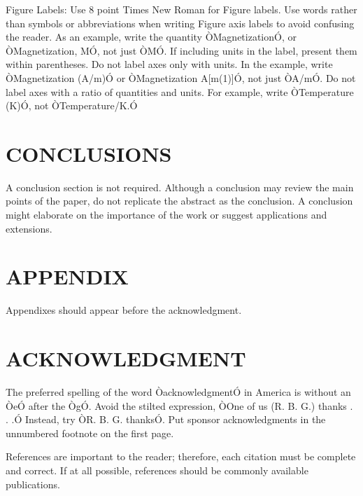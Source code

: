\documentclass[letterpaper, 10 pt, conference]{ieeeconf}  %
\begin{document}
Figure Labels: Use 8 point Times New Roman for Figure labels. Use words rather than symbols or abbreviations when writing Figure axis labels to avoid confusing the reader. As an example, write the quantity ÒMagnetizationÓ, or ÒMagnetization, MÓ, not just ÒMÓ. If including units in the label, present them within parentheses. Do not label axes only with units. In the example, write ÒMagnetization (A/m)Ó or ÒMagnetization {A[m(1)]}Ó, not just ÒA/mÓ. Do not label axes with a ratio of quantities and units. For example, write ÒTemperature (K)Ó, not ÒTemperature/K.Ó

\section{CONCLUSIONS}

A conclusion section is not required. Although a conclusion may review the main points of the paper, do not replicate the abstract as the conclusion. A conclusion might elaborate on the importance of the work or suggest applications and extensions. 

\addtolength{\textheight}{-12cm}   %







\section*{APPENDIX}

Appendixes should appear before the acknowledgment.

\section*{ACKNOWLEDGMENT}

The preferred spelling of the word ÒacknowledgmentÓ in America is without an ÒeÓ after the ÒgÓ. Avoid the stilted expression, ÒOne of us (R. B. G.) thanks . . .Ó  Instead, try ÒR. B. G. thanksÓ. Put sponsor acknowledgments in the unnumbered footnote on the first page.




References are important to the reader; therefore, each citation must be complete and correct. If at all possible, references should be commonly available publications.




\end{document}
